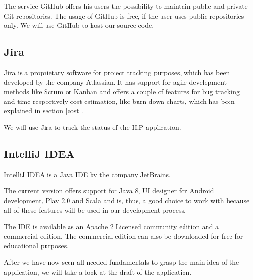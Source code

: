 The service GitHub offers his users the possibility to maintain public and private Git repositories. The usage of GitHub is free, if the user uses public repositories only. We will use GitHub to host our source-code.

\subsection{Jira}
Jira is a proprietary software for project tracking purposes, which has been developed by the company Atlassian. It has support for agile development methods like Scrum or Kanban and offers a couple of features for bug tracking and time respectively cost estimation, like burn-down charts, which has been explained in section \ref{cost}. 

We will use Jira to track the status of the \ac{HiP} application.

\subsection{IntelliJ IDEA}
IntelliJ IDEA is a Java \ac{IDE} by the company JetBrains. 

The current version offers support for Java 8, UI designer for Android development, Play 2.0 and Scala and is, thus, a good choice to work with because all of these features will be used in our development process.

The \ac{IDE} is available as an Apache 2 Licensed community edition and a commercial edition. The commercial edition can also be downloaded for free for educational purposes.

After we have now seen all needed fundamentals to grasp the main idea of the application, we will take a look at the draft of the application.